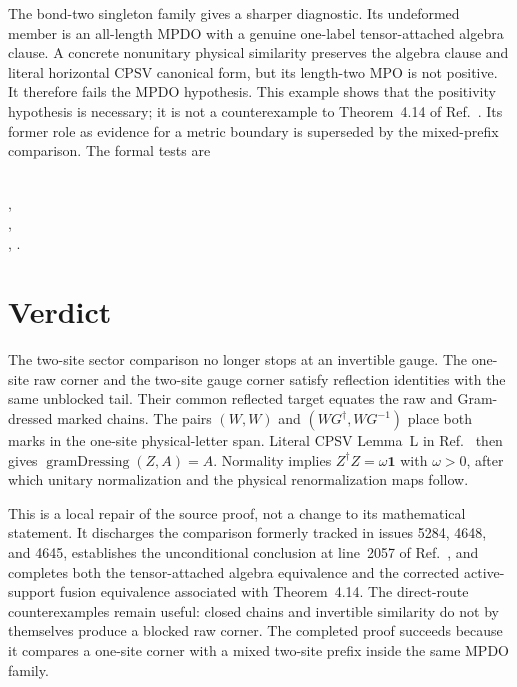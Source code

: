 \documentclass{article}
\begin{document}
The bond-two singleton family gives a sharper diagnostic. Its undeformed
member is an all-length MPDO with a genuine one-label tensor-attached algebra
clause. A concrete nonunitary physical similarity preserves the algebra
clause and literal horizontal CPSV canonical form, but its length-two MPO is
not positive. It therefore fails the MPDO hypothesis. This example shows that
the positivity hypothesis is necessary; it is not a counterexample to
Theorem~4.14 of Ref.~\cite{Cirac2016MPDO_arXiv}. Its former role as evidence
for a metric boundary is superseded by the mixed-prefix comparison. The
formal tests are
\begin{center}
\scriptsize
\mbox{}\\
\mbox{,}\\
\mbox{,}\\
\mbox{,}\qquad
\mbox{.}
\end{center}

\section{Verdict}

The two-site sector comparison no longer stops at an invertible gauge. The
one-site raw corner and the two-site gauge corner satisfy reflection
identities with the same unblocked tail. Their common reflected target equates
the raw and Gram-dressed marked chains. The pairs $(W,W)$ and
$(WG^\dagger,WG^{-1})$ place both marks in the one-site physical-letter span.
Literal CPSV Lemma~L in Ref.~\cite{Cirac2016MPDO_arXiv} then gives
$\operatorname{gramDressing}(Z,A)=A$. Normality implies
$Z^\dagger Z=\omega\mathbf 1$ with $\omega>0$, after which unitary
normalization and the physical renormalization maps follow.

This is a local repair of the source proof, not a change to its mathematical
statement. It discharges the comparison formerly tracked in issues 5284,
4648, and 4645, establishes the unconditional conclusion at line~2057 of
Ref.~\cite{Cirac2016MPDO_arXiv}, and completes both the tensor-attached
algebra equivalence and the corrected active-support fusion equivalence
associated with Theorem~4.14. The direct-route counterexamples remain useful:
closed chains and invertible similarity do not by themselves produce a
blocked raw corner. The completed proof succeeds because it compares a
one-site corner with a mixed two-site prefix inside the same MPDO family.



\end{document}
